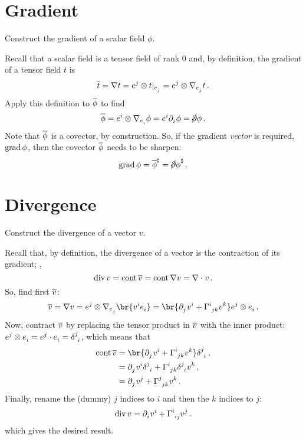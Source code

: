 \section{Gradient}
\label{sec:gradient}

Construct the gradient of a scalar field $\phi$.

Recall that a scalar field is a tensor field of rank 0 and, by definition, the gradient of a tensor field $t$ is
%
\begin{equation*}
  \grad t = \ograd t
  = \tbcov j\tprod\cder t{\tbvec j}
  = \tbcov j\tprod\ocder{\tbvec j}t\,.
\end{equation*}
%
Apply this definition to $\overline{\phi}$ to find
%
\begin{equation*}
  \grad\phi = \tbcov i\tprod\ocder{\tbvec i}\phi
  = \tbcov i\cpd i\phi
  = \slashed\partial\phi\,.
\end{equation*}
%
Note that $\overline{\phi}$ is a covector, by construction. So, if the gradient \emph{vector} is required, $\operatorname{grad}\phi$, then the covector $\overline{\phi}$ needs to be sharpen:
%
\begin{equation*}
  \operatorname{grad}\phi = {\overline{\phi}}^{\sharp}
  = {\cancel\partial\phi}^{\sharp}\,.
\end{equation*}


\section{Divergence}
\label{sec:divergence}

Construct the divergence of a vector $v$.

Recall that, by definition, the divergence of a vector is the contraction of its gradient; \ie,
%
\begin{equation*}
  \operatorname{div} v = \operatorname{cont}\overline{v}
  = \operatorname{cont}\nabla v
  = \nabla\cdot v\,.
\end{equation*}
%
So, find first $\overline{v}$:
%
\begin{equation*}
  \grad v = \ograd v
  = \tbcov j\tprod\ocder{\tbvec j}\br{\tvec vi\tbvec i}
  = \br{\cpd j\tvec vi + \tchris ijk\tvec vk}\tbcov j\tprod\tbvec i\,.
\end{equation*}
%
Now, contract $\overline{v}$ by replacing the tensor product in $\overline{v}$ with the inner product: $\tbcov j\tprod\tbvec i = \tbcov j\iprod\tbvec i = \tkron ji$, which means that
%
\begin{align*}
  \cont\grad v &= \br{\cpd j\tvec vi + \tchris ijk\tvec vk}\tkron ji\,,\\
  &= \cpd j\tvec vi\tkron ji + \tchris ijk\tkron ji\tvec vk \,,\\
  &= \cpd j\tvec vj + \tchris jjk\tvec vk \,.
\end{align*}
%
Finally, rename the (dummy) $j$ indices to $i$ and then the $k$ indices to $j$:
%
\begin{equation*}
  \vdiv v = \cpd i\tvec vi + \tchris iij\tvec vj\,.
\end{equation*}
%
which gives the desired result.
